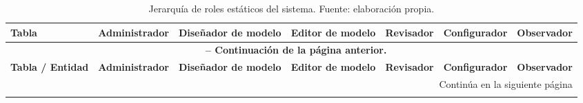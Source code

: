 \begin{longtable}{|p{2.3cm}|p{2.0cm}|p{2.0cm}|p{2.0cm}|p{2.0cm}|p{2.0cm}|p{1.9cm}|}
\caption{Jerarquía de roles estáticos del sistema. Fuente: elaboración propia.\label{tab:jerarquia_roles}} \\
\hline
\textbf{Tabla} & \textbf{Administrador} & \textbf{Diseñador de modelo} & \textbf{Editor de modelo} & \textbf{Revisador} & \textbf{Configurador} & \textbf{Observador} \\
\hline
\endfirsthead
\multicolumn{7}{c}{{\bfseries \tablename\ \thetable{} -- Continuación de la página anterior.}} \\
\hline
\textbf{Tabla / Entidad} & \textbf{Administrador} & \textbf{Diseñador de modelo} & \textbf{Editor de modelo} & \textbf{Revisador} & \textbf{Configurador} & \textbf{Observador} \\
\hline
\endhead
\hline \multicolumn{7}{|r|}{{Continúa en la siguiente página}} \\ \hline
\endfoot
\hline
\endlastfoot


\end{longtable}
